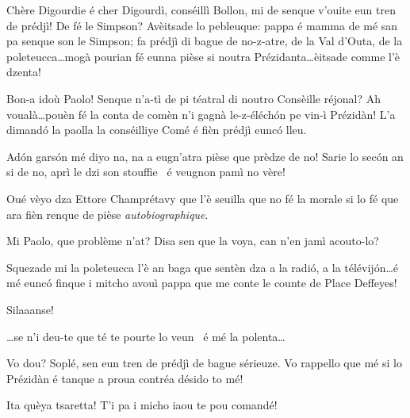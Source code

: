 \begin{drama}

\Dallasspeaks Chère Digourdie é cher Digourdì, conséillì Bollon, mi de senque v'ouite eun tren de prédjì! De fé le Simpson? Avèitsade lo pebleuque: pappa é mamma de mé san pa senque son le Simpson; fa prédjì di bague de no-z-atre, de la Val d'Outa, de la poleteucca\ldots mogà pourian fé eunna pièse si noutra Prézidanta\ldots èitsade comme l'è dzenta!

\Presidanspeaks Bon-a idoù Paolo! Senque n'a-tì de pi téatral di noutro Consèille réjonal? Ah voualà\ldots pouèn fé la conta de comèn n'i gagnà le-z-éléch\'on pe vin-ì Prézidàn!  L’a dimand\'o la paolla la conséilliye Comé é fièn prédjì eunc\'o lleu.

\Sophiespeaks Ad\'on gars\'on mé diyo na, na a eugn'atra pièse que prèdze de no! Sarie lo sec\'on an si de no, aprì le dzi son stouffie \stufo\ é veugnon pamì no vère!

\Cimaspeaks Oué vèyo dza Ettore Champrétavy que l'è seuilla  que no fé la morale si lo fé que ara fièn renque de pièse \textit{autobiographique}.

\Joellespeaks Mi Paolo, que problème n'at? Disa sen que la voya, can n'en jamì acouto-lo?


\Eyviaspeaks Squezade mi la poleteucca l'è an baga que sentèn dza a la radi\'o, a la télévij\'on\ldots é mé eunc\'o finque i mitcho avouì pappa que me conte le counte de Place Deffeyes!


\Presidanspeaks{} Silaaanse! 


\Secreteospeaks \ldots se n'i deu-te que té te pourte lo veun \wine\ é mé la polenta\ldots


\Presidanspeaks Vo dou? Soplé, sen eun tren de prédjì de bague sérieuze.  Vo rappello que mé si lo Prézidàn é tanque a proua contréa désido to mé!

\Marcospeaks Ita quèya tsaretta! T'i pa i micho iaou te pou comandé!


\end{drama}
